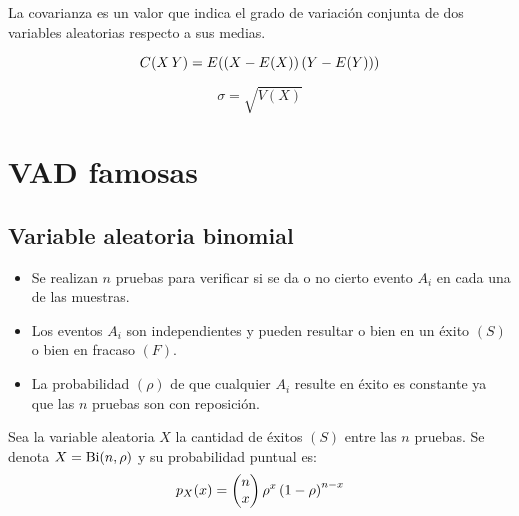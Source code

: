 La covarianza es un valor que indica el grado de variación conjunta de dos variables aleatorias respecto a sus medias.

\begin{mdframed}[style=DefinitionFrame]
    \begin{defn}
    \end{defn}
    \begin{equation*}
        \fx[C]{X\,Y} = \fx[E]{\inParentheses{X-\fx[E]{X}} \inParentheses{Y-\fx[E]{Y}}}
    \end{equation*}
\end{mdframed}

\begin{mdframed}[style=DefinitionFrame]
    \begin{defn}
    \end{defn}
    \begin{equation*}
        \sigma = \sqrt{V(X)}
    \end{equation*}
\end{mdframed}


\section{VAD famosas}


\subsection{Variable aleatoria binomial}

\begin{itemize}
\item Se realizan $n$ pruebas para verificar si se da o no cierto evento $A_i$ en cada una de las muestras.

\item Los eventos $A_i$ son independientes y pueden resultar o bien en un éxito $(S)$ o bien en fracaso $(F)$.

\item La probabilidad $(\rho)$ de que cualquier $A_i$ resulte en éxito es constante ya que las $n$ pruebas son con reposición.
\end{itemize}

Sea la variable aleatoria $X$ la cantidad de éxitos $(S)$ entre las $n$ pruebas.
Se denota $X=\bi(n,\rho)$ y su probabilidad puntual es:
\begin{equation*}
p_X(x) = \comb{n}{x} \rho^x \inParentheses{1-\rho}^{n-x}
\end{equation*}

